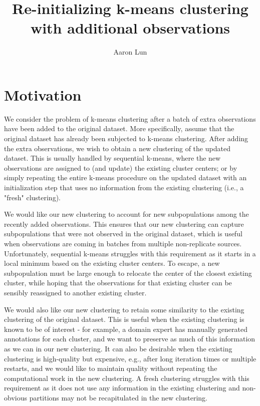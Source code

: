 \documentclass{article}
\title{Re-initializing k-means clustering with additional observations}
\author[1]{Aaron Lun}
\affil[1]{Genentech, Inc. South San Francisco, CA}
\begin{document}
\maketitle

\section{Motivation}

We consider the problem of k-means clustering after a batch of extra observations have been added to the original dataset.
More specifically, assume that the original dataset has already been subjected to k-means clustering.
After adding the extra observations, we wish to obtain a new clustering of the updated dataset.
This is usually handled by sequential k-means, where the new observations are assigned to (and update) the existing cluster centers;
or by simply repeating the entire k-means procedure on the updated dataset with an initialization step that uses no information from the existing clustering (i.e., a "fresh" clustering).

We would like our new clustering to account for new subpopulations among the recently added observations.
This ensures that our new clustering can capture subpopulations that were not observed in the original dataset,
which is useful when observations are coming in batches from multiple non-replicate sources.
Unfortunately, sequential k-means struggles with this requirement as it starts in a local minimum based on the existing cluster centers.
To escape, a new subpopulation must be large enough to relocate the center of the closest existing cluster, 
while hoping that the observations for that existing cluster can be sensibly reassigned to another existing cluster.

We would also like our new clustering to retain some similarity to the existing clustering of the original dataset.
This is useful when the existing clustering is known to be of interest - 
for example, a domain expert has manually generated annotations for each cluster,
and we want to preserve as much of this information as we can in our new clustering.
It can also be desirable when the existing clustering is high-quality but expensive, e.g., after long iteration times or multiple restarts,
and we would like to maintain quality without repeating the computational work in the new clustering.
A fresh clustering struggles with this requirement as it does not use any information in the existing clustering
and non-obvious partitions may not be recapitulated in the new clustering.
\end{document}
